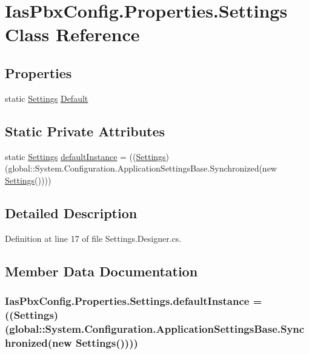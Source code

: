 \hypertarget{class_ias_pbx_config_1_1_properties_1_1_settings}{
\section{IasPbxConfig.Properties.Settings Class Reference}
\label{class_ias_pbx_config_1_1_properties_1_1_settings}
}
\subsection*{Properties}
\begin{DoxyCompactItemize}
\item 
static \hyperlink{class_ias_pbx_config_1_1_properties_1_1_settings}{Settings} \hyperlink{class_ias_pbx_config_1_1_properties_1_1_settings_a4258658fd8efaea7976b65ef9b54381c}{Default}
\end{DoxyCompactItemize}
\subsection*{Static Private Attributes}
\begin{DoxyCompactItemize}
\item 
static \hyperlink{class_ias_pbx_config_1_1_properties_1_1_settings}{Settings} \hyperlink{class_ias_pbx_config_1_1_properties_1_1_settings_a0934dae362ce734be6368ce2994eaa1e}{defaultInstance} = ((\hyperlink{class_ias_pbx_config_1_1_properties_1_1_settings}{Settings})(global::System.Configuration.ApplicationSettingsBase.Synchronized(new \hyperlink{class_ias_pbx_config_1_1_properties_1_1_settings}{Settings}())))
\end{DoxyCompactItemize}


\subsection{Detailed Description}


Definition at line 17 of file Settings.Designer.cs.

\subsection{Member Data Documentation}
\hypertarget{class_ias_pbx_config_1_1_properties_1_1_settings_a0934dae362ce734be6368ce2994eaa1e}{
\subsubsection[{defaultInstance}]{ {\bf IasPbxConfig.Properties.Settings.defaultInstance} = (({\bf Settings})(global::System.Configuration.ApplicationSettingsBase.Synchronized(new {\bf Settings}())))}}
\label{class_ias_pbx_config_1_1_properties_1_1_settings_a0934dae362ce734be6368ce2994eaa1e}


